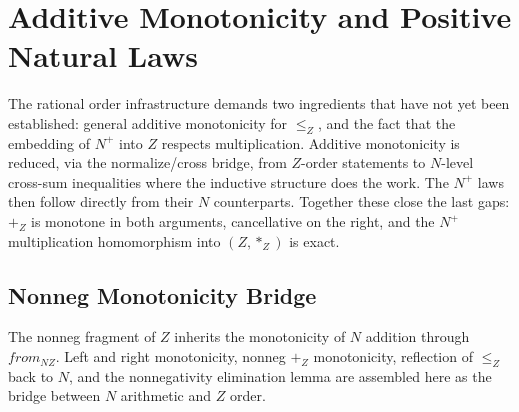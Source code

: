 \documentclass[11pt,a4paper]{book}
\def\mathrm#1{#1}%
\def\mathbb#1{#1}%
\begin{document}
\chapter{Additive Monotonicity and Positive Natural Laws}

The rational order infrastructure demands two ingredients that have not yet been established: general additive monotonicity for $\le_{\mathbb{Z}}$, and the fact that the embedding of $\mathbb{N}^+$ into $\mathbb{Z}$ respects multiplication. Additive monotonicity is reduced, via the normalize/cross bridge, from $\mathbb{Z}$-order statements to $\mathbb{N}$-level cross-sum inequalities where the inductive structure does the work. The $\mathbb{N}^+$ laws then follow directly from their $\mathbb{N}$ counterparts. Together these close the last gaps: $+_{\mathbb{Z}}$ is monotone in both arguments, cancellative on the right, and the $\mathbb{N}^+$ multiplication homomorphism into $(\mathbb{Z}, *_{\mathbb{Z}})$ is exact.

\section{Nonneg Monotonicity Bridge}

The nonneg fragment of $\mathbb{Z}$ inherits the monotonicity of $\mathbb{N}$ addition through $\mathrm{from}_{\mathbb{N}\mathbb{Z}}$.
Left and right monotonicity, nonneg $+_{\mathbb{Z}}$ monotonicity, reflection of $\le_{\mathbb{Z}}$ back to $\mathbb{N}$, and the nonnegativity elimination lemma are assembled here as the bridge between $\mathbb{N}$ arithmetic and $\mathbb{Z}$ order.
\end{document}
